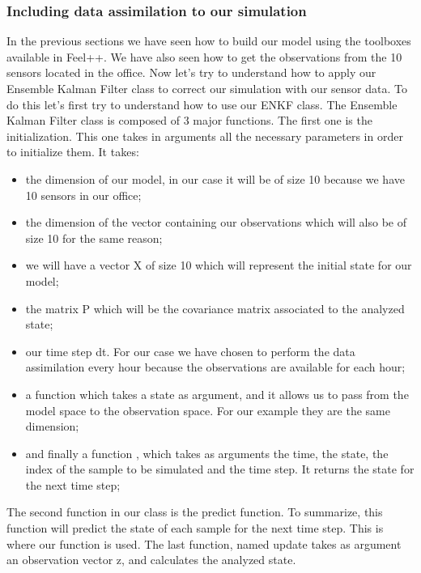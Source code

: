 \subsubsection{Including data assimilation to our simulation}
\noindent In the previous sections we have seen how to build our model using the toolboxes available in Feel++. We have also seen how to get the observations from the 10 sensors located in the office. Now let's try to understand how to apply our Ensemble Kalman Filter class to correct our simulation with our sensor data. To do this let's first try to understand how to use our ENKF class. 
\newline\noindent The Ensemble Kalman Filter  class is composed of 3 major functions. 
\newline\noindent The first one is the initialization. This one takes in arguments all the necessary parameters in order to initialize them. It takes: 
\begin{itemize}
    \item the dimension of our model, in our case it will be of size 10 because we have 10 sensors in our office;
    \item the dimension of the vector containing our observations which will also be of size 10 for the same reason;
    \item we will have a vector X of size 10 which will represent the initial state for our model;
    \item the matrix P which will be the covariance matrix associated to the analyzed state;
    \item our time step dt. For our case we have chosen to perform the data assimilation every hour because the observations are available for each hour;
    \item a function  which takes a state as argument, and it allows us to pass from the model space to the observation space. For our example they are the same dimension;
    \item and finally a function , which takes as arguments the time, the state, the index of the sample to be simulated and the time step. It returns the state for the next time step;

\end{itemize}
\noindent The second function in our class is the predict function. To summarize, this function will predict the state of each sample for the next time step. This is where our  function is used. 
The last function, named update takes as argument an observation vector z, and calculates the analyzed state. 
